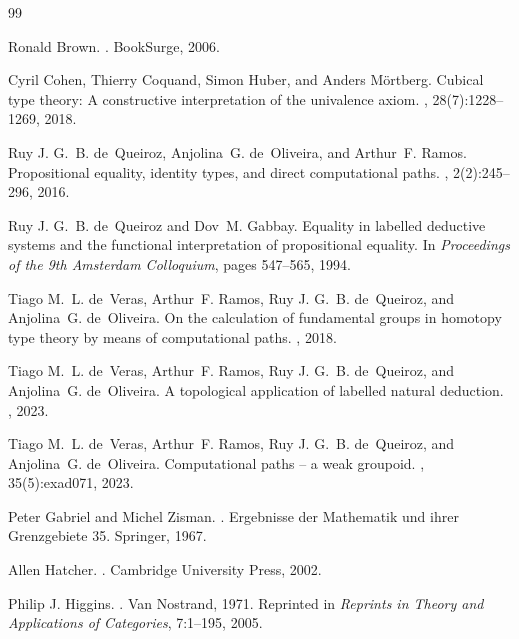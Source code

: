 \documentclass{lmcs}
\theoremstyle{definition}
\theoremstyle{plain}
\theoremstyle{remark}
\begin{document}
\begin{thebibliography}{99}

Ronald Brown.
.
\newblock BookSurge, 2006.

Cyril Cohen, Thierry Coquand, Simon Huber, and Anders M{\"o}rtberg.
\newblock Cubical type theory: A constructive interpretation of the univalence axiom.
, 28(7):1228--1269, 2018.

Ruy J. G.~B. de~Queiroz, Anjolina~G. de~Oliveira, and Arthur~F. Ramos.
\newblock Propositional equality, identity types, and direct computational paths.
, 2(2):245--296, 2016.

Ruy J. G.~B. de~Queiroz and Dov~M. Gabbay.
\newblock Equality in labelled deductive systems and the functional interpretation of propositional equality.
\newblock In {\em Proceedings of the 9th Amsterdam Colloquium}, pages 547--565, 1994.

Tiago M.~L. de~Veras, Arthur~F. Ramos, Ruy J. G.~B. de~Queiroz, and Anjolina~G. de~Oliveira.
\newblock On the calculation of fundamental groups in homotopy type theory by means of computational paths.
, 2018.

Tiago M.~L. de~Veras, Arthur~F. Ramos, Ruy J. G.~B. de~Queiroz, and Anjolina~G. de~Oliveira.
\newblock A topological application of labelled natural deduction.
, 2023.

Tiago M.~L. de~Veras, Arthur~F. Ramos, Ruy J. G.~B. de~Queiroz, and Anjolina~G. de~Oliveira.
\newblock Computational paths -- a weak groupoid.
, 35(5):exad071, 2023.

Peter Gabriel and Michel Zisman.
.
\newblock Ergebnisse der Mathematik und ihrer Grenzgebiete 35. Springer, 1967.

Allen Hatcher.
.
\newblock Cambridge University Press, 2002.

Philip J. Higgins.
.
\newblock Van Nostrand, 1971.
\newblock Reprinted in {\em Reprints in Theory and Applications of Categories},
7:1--195, 2005.


\end{thebibliography}
\end{document}
